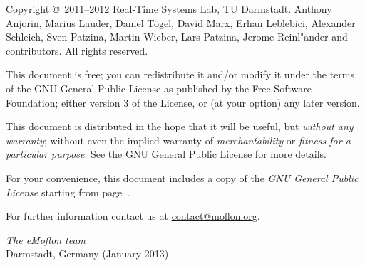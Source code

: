\documentclass[11pt,a4paper, twoside]{book}
\begin{document}
   
  
\frontmatter   

\maketitle

\begin{small} 
Copyright \copyright~2011--2012 Real-Time Systems Lab, TU Darmstadt.
Anthony Anjorin, Marius Lauder, Daniel T\"ogel, David Marx, Erhan Leblebici, Alexander Schleich, Sven Patzina, Martin Wieber, Lars Patzina, Jerome Reinl"ander and contributors.
All rights reserved.

This document is free; you can redistribute it and/or modify it under the terms of the GNU General Public License as published by the Free Software Foundation; either version 3 of the License, or (at your option) any later version.
 
This document is distributed in the hope that it will be useful, but \emph{without any warranty}; without even the implied warranty of \emph{merchantability} or \emph{fitness for a particular purpose}.
See the GNU General Public License for more details.
 
For your convenience, this document includes a copy of the \emph{GNU General Public License} starting from page~\pageref{chap:gpl}.
  
For further information contact us at \href{mailto:contact@moflon.org}{contact@moflon.org}.
  
\vskip3cm
\textit{The eMoflon team}\\
Darmstadt, Germany (January 2013)
\end{small}


\tableofcontents

\setcounter{romanpages}{\value{page}}

\mainmatter
 













\end{document}
